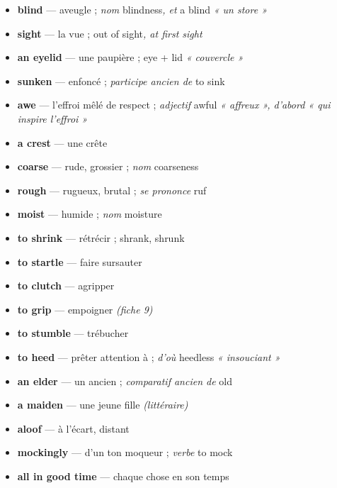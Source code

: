 \documentclass{fiche}
\begin{document}

\begin{itemize}[label=--,itemsep=0.8mm,leftmargin=*]\small
  \item \textbf{blind} — aveugle ; \textit{nom} blindness\textit{, et} a blind \textit{« un store »}
  \item \textbf{sight} — la vue ; out of sight\textit{, at first sight}
  \item \textbf{an eyelid} — une paupière ; eye + lid \textit{« couvercle »}
  \item \textbf{sunken} — enfoncé ; \textit{participe ancien de} to sink
  \item \textbf{awe} — l'effroi mêlé de respect ; \textit{adjectif} awful \textit{« affreux », d'abord « qui inspire l'effroi »}
  \item \textbf{a crest} — une crête
  \item \textbf{coarse} — rude, grossier ; \textit{nom} coarseness
  \item \textbf{rough} — rugueux, brutal ; \textit{se prononce} ruf
  \item \textbf{moist} — humide ; \textit{nom} moisture
  \item \textbf{to shrink} — rétrécir ; shrank, shrunk
  \item \textbf{to startle} — faire sursauter
  \item \textbf{to clutch} — agripper
  \item \textbf{to grip} — empoigner \textit{(fiche 9)}
  \item \textbf{to stumble} — trébucher
  \item \textbf{to heed} — prêter attention à ; \textit{d'où} heedless \textit{« insouciant »}
  \item \textbf{an elder} — un ancien ; \textit{comparatif ancien de} old
  \item \textbf{a maiden} — une jeune fille \textit{(littéraire)}
  \item \textbf{aloof} — à l'écart, distant
  \item \textbf{mockingly} — d'un ton moqueur ; \textit{verbe} to mock
  \item \textbf{all in good time} — chaque chose en son temps
\end{itemize}
\end{document}
